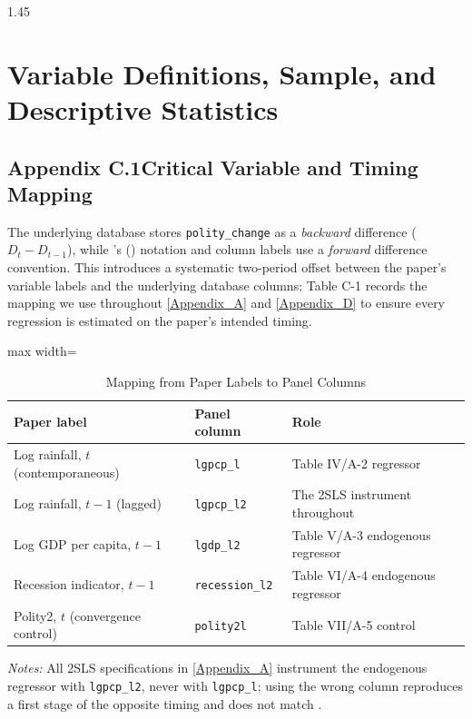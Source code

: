 \documentclass[12pt]{article}
\begin{document}
\begin{bibunit}[jpe]
\begin{spacing}{1.45}
\section{Variable Definitions, Sample, and Descriptive Statistics\label{Appendix_C}}

\subsection*{Appendix C.1\quad Critical Variable and Timing Mapping}

The underlying database stores \texttt{polity\_change} as a \emph{backward} difference ($D_t - D_{t-1}$), while \citeauthor{bruckner2011rain}'s (\citeyear{bruckner2011rain}) notation and column labels use a \emph{forward} difference convention. This introduces a systematic two-period offset between the paper's variable labels and the underlying database columns; Table C-1 records the mapping we use throughout \ref{Appendix_A} and \ref{Appendix_D} to ensure every regression is estimated on the paper's intended timing.

\begin{table}[H]
\centering
\begin{adjustbox}{max width=\textwidth}
\begin{threeparttable}
\caption{Mapping from Paper Labels to Panel Columns}
\label{tab:C1}
\begin{tabular}{llp{6cm}}
\toprule
Paper label & Panel column & Role \\
\midrule
Log rainfall, $t$ (contemporaneous)  & \texttt{lgpcp\_l}  & Table IV/A-2 regressor \\
Log rainfall, $t-1$ (lagged)         & \texttt{lgpcp\_l2} & The 2SLS instrument throughout \\
Log GDP per capita, $t-1$            & \texttt{lgdp\_l2}  & Table V/A-3 endogenous regressor \\
Recession indicator, $t-1$           & \texttt{recession\_l2} & Table VI/A-4 endogenous regressor \\
Polity2, $t$ (convergence control)   & \texttt{polity2l}  & Table VII/A-5 control \\
\bottomrule
\end{tabular}
\begin{tablenotes}[flushleft]
\footnotesize
\item \textit{Notes:} All 2SLS specifications in \ref{Appendix_A} instrument the endogenous regressor with \texttt{lgpcp\_l2}, never with \texttt{lgpcp\_l}; using the wrong column reproduces a first stage of the opposite timing and does not match \citet{bruckner2011rain}.
\end{tablenotes}
\end{threeparttable}
\end{adjustbox}
\end{table}


\end{spacing}
\end{bibunit}
\end{document}
